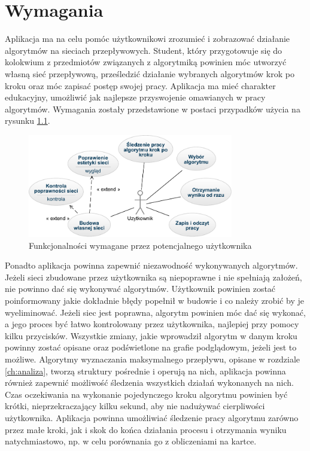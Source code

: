 \chapter{Wymagania}\label{chap:wymagania}
Aplikacja ma na celu pomóc użytkownikowi zrozumieć i zobrazować działanie algorytmów na sieciach przepływowych. Student, który przygotowuje się do kolokwium z przedmiotów związanych z algorytmiką powinien móc utworzyć własną sieć przepływową, prześledzić działanie wybranych algorytmów krok po kroku oraz móc zapisać postęp swojej pracy. Aplikacja ma mieć charakter edukacyjny, umożliwić jak najlepsze przyswojenie omawianych w pracy algorytmów. Wymagania zostały przedstawione w postaci przypadków użycia na rysunku \ref{fig:userCases}.
\begin{figure}[H]
	\centering
	\includegraphics[width=0.8\textwidth]{./img/user_case2}
	\caption{Funkcjonalności wymagane przez potencjalnego użytkownika}
	\label{fig:userCases}
\end{figure}
Ponadto aplikacja powinna zapewnić niezawodność wykonywanych algorytmów. Jeżeli sieci zbudowane przez użytkownika są niepoprawne i nie spełniają założeń, nie powinno dać się wykonywać algorytmów. Użytkownik powinien zostać poinformowany jakie dokładnie błędy popełnił w budowie i co należy zrobić by je wyeliminować. Jeżeli siec jest poprawna, algorytm powinien móc dać się wykonać, a jego proces być łatwo kontrolowany przez użytkownika, najlepiej przy pomocy kilku przycisków. Wszystkie zmiany, jakie wprowadził algorytm w danym kroku powinny zostać opisane oraz podświetlone na grafie podglądowym, jeżeli jest to możliwe. Algorytmy wyznaczania maksymalnego przepływu, opisane w rozdziale \ref{ch:analiza}, tworzą struktury pośrednie i operują na nich, aplikacja powinna również zapewnić możliwość śledzenia wszystkich działań wykonanych na nich.\\\indent
Czas oczekiwania na wykonanie pojedynczego kroku algorytmu powinien być krótki, nieprzekraczający kilku sekund, aby nie nadużywać cierpliwości użytkownika. Aplikacja powinna umożliwiać śledzenie pracy algorytmu zarówno przez małe kroki, jak i skok do końca działania procesu i otrzymania wyniku natychmiastowo, np. w celu porównania go z obliczeniami na kartce.